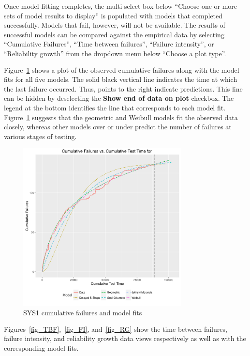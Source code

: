 \documentclass[journal]{IEEEtran}
\begin{document}
Once model fitting completes, the multi-select box below ``Choose one or more sets of model results to display'' is populated with models that completed successfully. Models that fail, however, will not be available. The results of successful models can be compared against the empirical data by selecting ``Cumulative Failures'', ``Time between failures'', ``Failure intensity'', or ``Reliability growth'' from the dropdown menu below ``Choose a plot type''.

Figure~\ref{fig_SYS1_Cum} shows a plot of the observed cumulative failures along with the model fits for all five models. The solid black vertical line indicates the time at which the last failure occurred. Thus, points to the right indicate predictions. This line can be hidden by deselecting the \textbf{Show end of data on plot} checkbox. The legend at the bottom identifies the line that corresponds to each model fit. Figure~\ref{fig_SYS1_Cum} suggests that the geometric and Weibull models fit the observed data closely, whereas other models over or under predict the number of failures at various stages of testing.

\begin{figure}[!h]
\centering
\includegraphics[width=3.4in]{Figures/SRT6}
\caption{SYS1 cumulative failures and model fits}
\label{fig_SYS1_Cum}
\end{figure}


Figures~\ref{fig_TBF},~\ref{fig_FI}, and~\ref{fig_RG} show the time between failures, failure intensity, and reliability growth data views respectively as well as with the corresponding model fits.
\end{document}
